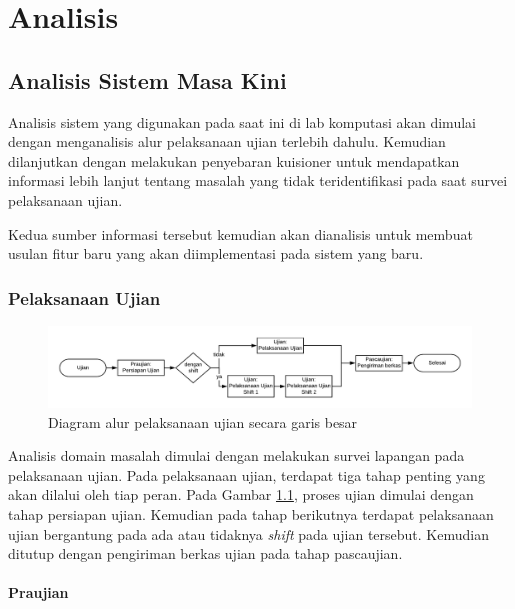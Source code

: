 \chapter{Analisis}
\label{chap:analisis}

\section{Analisis Sistem Masa Kini}
    Analisis sistem yang digunakan pada saat ini di lab komputasi akan dimulai dengan menganalisis alur pelaksanaan ujian terlebih dahulu. Kemudian dilanjutkan dengan melakukan penyebaran kuisioner untuk mendapatkan informasi lebih lanjut tentang masalah yang tidak teridentifikasi pada saat survei pelaksanaan ujian.
    
    Kedua sumber informasi tersebut kemudian akan dianalisis untuk membuat usulan fitur baru yang akan diimplementasi pada sistem yang baru.

\subsection{Pelaksanaan Ujian}

    \begin{figure}[H]
        \centering
        \includegraphics[width=0.75\paperwidth]{Gambar/flowchart/exam-flow-ujian.pdf}
        \caption{Diagram alur pelaksanaan ujian secara garis besar}
        \label{fig:flowchart-exam-outline}
    \end{figure}
    
    Analisis domain masalah dimulai dengan melakukan survei lapangan pada pelaksanaan ujian. Pada pelaksanaan ujian, terdapat tiga tahap penting yang akan dilalui oleh tiap peran. Pada Gambar \ref{fig:flowchart-exam-outline}, proses ujian dimulai dengan tahap persiapan ujian. Kemudian pada tahap berikutnya terdapat pelaksanaan ujian bergantung pada ada atau tidaknya \textit{shift} pada ujian tersebut. Kemudian ditutup dengan pengiriman berkas ujian pada tahap pascaujian.
    
    \subsubsection{Praujian}
    
